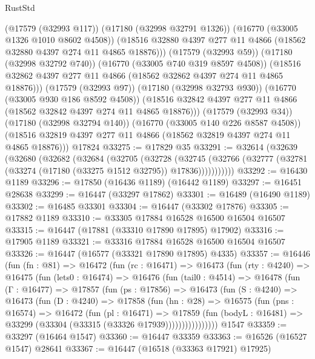 \begin{lexlean}{RustStd}
\begin{coremodule}
            (@17579 (@32993 @117))
            (@17180 (@32998 @32791 @1326))
            (@16770 (@33005 @1326 @1010 @8602 @4508))
            (@18516 @32880 @4397 @277 @11 @4866 (@18562 @32880 @4397 @274 @11 @4865 @18876)))
          (@17579 (@32993 @59))
          (@17180 (@32998 @32792 @740))
          (@16770 (@33005 @740 @319 @8597 @4508))
          (@18516 @32862 @4397 @277 @11 @4866 (@18562 @32862 @4397 @274 @11 @4865 @18876)))
        (@17579 (@32993 @97))
        (@17180 (@32998 @32793 @930))
        (@16770 (@33005 @930 @186 @8592 @4508))
        (@18516 @32842 @4397 @277 @11 @4866 (@18562 @32842 @4397 @274 @11 @4865 @18876)))
      (@17579 (@32993 @34))
      (@17180 (@32998 @32794 @140))
      (@16770 (@33005 @140 @226 @8587 @4508))
      (@18516 @32819 @4397 @277 @11 @4866 (@18562 @32819 @4397 @274 @11 @4865 @18876)))
    @17824
@33275 := @17829 @35
@33291 := @32614
    (@32639
      (@32680
        (@32682
          (@32684
            (@32705
              (@32728
                (@32745
                  (@32766 (@32777 (@32781 (@33274 (@17180 (@33275 @1512 @32795)) @17836)))))))))))
@33292 := @16430 @1189
@33296 := @17850 (@16436 @1189) (@16442 @1189)
@33297 := @16451 @28638
@33299 := @16447 (@33297 @17862)
@33301 := @16489 (@16490 @1189)
@33302 := @16485 @33301
@33304 := @16447 (@33302 @17876)
@33305 := @17882 @1189
@33310 := @33305 @17884 @16528 @16500 @16504 @16507
@33315 := @16447 (@17881 (@33310 @17890 @17895) @17902)
@33316 := @17905 @1189
@33321 := @33316 @17884 @16528 @16500 @16504 @16507
@33326 := @16447 (@16577 (@33321 @17890 @17895) @4335)
@33357 := @16446
    (fun (fn : @81) =>
    @16472
      (fun (rc : @16471) =>
      @16473
        (fun (rty : @4240) =>
        @16475
          (fun (lets0 : @16474) =>
          @16476
            (fun (tail0 : @4514) =>
            @16478
              (fun (Γ : @16477) =>
              @17857
                (fun (ps : @17856) =>
                @16473
                  (fun (S : @4240) =>
                  @16473
                    (fun (D : @4240) =>
                    @17858
                      (fun (hn : @28) =>
                      @16575
                        (fun (pns : @16574) =>
                        @16472
                          (fun (pl : @16471) =>
                          @17859
                            (fun (bodyL : @16481) =>
                            @33299 (@33304 (@33315 (@33326 @17939))))))))))))))))
    @1547
@33359 := @33297 (@16464 @1547)
@33360 := @16447 @33359
@33363 := @16526 (@16527 @1547) @28641
@33367 := @16447 (@16518 (@33363 @17921) @17925)

\end{coremodule}
\end{lexlean}
